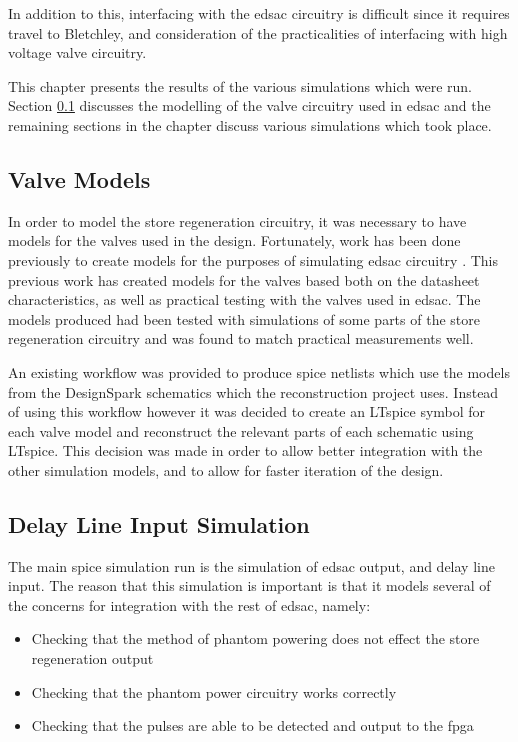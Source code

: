 In addition to this, interfacing with the \gls{edsac} circuitry is difficult since it requires travel to Bletchley, and consideration of the practicalities of interfacing with high voltage valve circuitry.

This chapter presents the results of the various simulations which were run. Section \ref{sec:spice-valve-models} discusses the modelling of the valve circuitry used in \gls{edsac} and the remaining sections in the chapter discuss various simulations which took place.

\subsection{Valve Models} \label{sec:spice-valve-models}

In order to model the store regeneration circuitry, it was necessary to have models for the valves used in the design. Fortunately, work has been done previously to create models for the purposes of simulating \gls{edsac} circuitry \cite{linnington2015}. This previous work has created models for the valves based both on the datasheet characteristics, as well as practical testing with the valves used in \gls{edsac}. The models produced had been tested with simulations of some parts of the store regeneration circuitry and was found to match practical measurements well.

An existing workflow was provided to produce \gls{spice} netlists which use the models from the DesignSpark \cite{rs2017} schematics which the reconstruction project uses. Instead of using this workflow however it was decided to create an LTspice symbol for each valve model and reconstruct the relevant parts of each schematic using LTspice. This decision was made in order to allow better integration with the other simulation models, and to allow for faster iteration of the design.

\subsection{Delay Line Input Simulation}
The main \gls{spice} simulation run is the simulation of \gls{edsac} output, and delay line input. The reason that this simulation is important is that it models several of the concerns for integration with the rest of \gls{edsac}, namely:
\begin{itemize}
	\item Checking that the method of phantom powering does not effect the store regeneration output
	\item Checking that the phantom power circuitry works correctly
	\item Checking that the pulses are able to be detected and output to the \gls{fpga}
\end{itemize}

